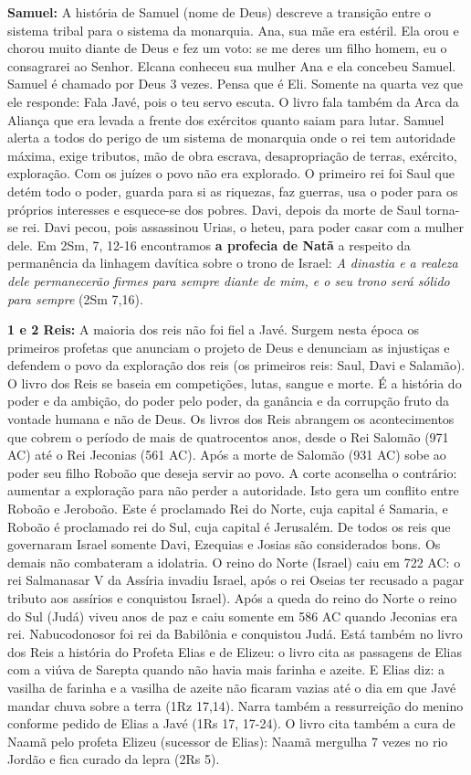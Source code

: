 \documentclass[
]{book}
\begin{document}
\textbf{Samuel:} A história de Samuel (nome de Deus) descreve a transição entre o sistema tribal para o sistema da monarquia. Ana, sua mãe era estéril. Ela orou e chorou muito diante de Deus e fez um voto: se me deres um filho homem, eu o consagrarei ao Senhor. Elcana conheceu sua mulher Ana e ela concebeu Samuel. Samuel é chamado por Deus 3 vezes. Pensa que é Eli. Somente na quarta vez que ele responde: Fala Javé, pois o teu servo escuta. O livro fala também da Arca da Aliança que era levada a frente dos exércitos quanto saiam para lutar. Samuel alerta a todos do perigo de um sistema de monarquia onde o rei tem autoridade máxima, exige tributos, mão de obra escrava, desapropriação de terras, exército, exploração. Com os juízes o povo não era explorado. O primeiro rei foi Saul que detém todo o poder, guarda para si as riquezas, faz guerras, usa o poder para os próprios interesses e esquece-se dos pobres. Davi, depois da morte de Saul torna-se rei. Davi pecou, pois assassinou Urias, o heteu, para poder casar com a mulher dele. Em 2Sm, 7, 12-16 encontramos \textbf{a profecia de Natã} a respeito da permanência da linhagem davítica sobre o trono de Israel: \emph{A dinastia e a realeza dele permanecerão firmes para sempre diante de mim, e o seu trono será sólido para sempre} (2Sm 7,16).

\textbf{1 e 2 Reis:} A maioria dos reis não foi fiel a Javé. Surgem nesta época os primeiros profetas que anunciam o projeto de Deus e denunciam as injustiças e defendem o povo da exploração dos reis (os primeiros reis: Saul, Davi e Salamão). O livro dos Reis se baseia em competições, lutas, sangue e morte. É a história do poder e da ambição, do poder pelo poder, da ganância e da corrupção fruto da vontade humana e não de Deus. Os livros dos Reis abrangem os acontecimentos que cobrem o período de mais de quatrocentos anos, desde o Rei Salomão (971 AC) até o Rei Jeconias (561 AC). Após a morte de Salomão (931 AC) sobe ao poder seu filho Roboão que deseja servir ao povo. A corte aconselha o contrário: aumentar a exploração para não perder a autoridade. Isto gera um conflito entre Roboão e Jeroboão. Este é proclamado Rei do Norte, cuja capital é Samaria, e Roboão é proclamado rei do Sul, cuja capital é Jerusalém. De todos os reis que governaram Israel somente Davi, Ezequias e Josias são considerados bons. Os demais não combateram a idolatria. O reino do Norte (Israel) caiu em 722 AC: o rei Salmanasar V da Assíria invadiu Israel, após o rei Oseias ter recusado a pagar tributo aos assírios e conquistou Israel). Após a queda do reino do Norte o reino do Sul (Judá) viveu anos de paz e caiu somente em 586 AC quando Jeconias era rei. Nabucodonosor foi rei da Babilônia e conquistou Judá. Está também no livro dos Reis a história do Profeta Elias e de Elizeu: o livro cita as passagens de Elias com a viúva de Sarepta quando não havia mais farinha e azeite. E Elias diz: a vasilha de farinha e a vasilha de azeite não ficaram vazias até o dia em que Javé mandar chuva sobre a terra (1Rz 17,14). Narra também a ressurreição do menino conforme pedido de Elias a Javé (1Rs 17, 17-24). O livro cita também a cura de Naamã pelo profeta Elizeu (sucessor de Elias): Naamã mergulha 7 vezes no rio Jordão e fica curado da lepra (2Rs 5).
\end{document}
